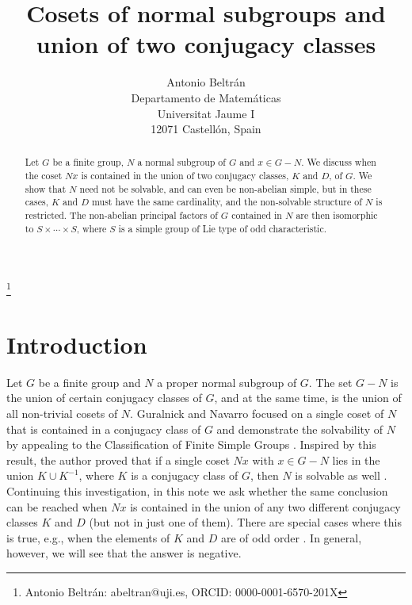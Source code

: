 \documentclass[12pt,leqno,a4paper]{amsart}
\numberwithin{equation}{section}
\begin{document}
\title[Cosets of normal subgroups and union of two conjugacy classes]{Cosets of normal subgroups  and union of two conjugacy classes}


    \author[Beltr\'an]{
       Antonio Beltr\'an\\
     Departamento de Matem\'aticas\\
      Universitat Jaume I \\
     12071 Castell\'on, Spain\\
        }

 \thanks{ Antonio Beltr\'an: abeltran@uji.es,                                                                                   ORCID: 0000-0001-6570-201X }




\begin{abstract}
Let $G$ be a finite group, $N$ a normal subgroup of $G$ and $x\in G-N$. We discuss when the coset $Nx$ is contained in the union of two conjugacy classes, $K$ and $D$,  of $G$. We show that $N$ need not be solvable, and can even be non-abelian simple, but in these cases, $K$ and $D$ must have the same cardinality, and the non-solvable structure of $N$ is restricted. The non-abelian principal factors of $G$  contained in $N$ are  then isomorphic to $S\times \cdots\times S$, where $S$ is a simple group of Lie type of odd characteristic.
\end{abstract}



\maketitle

\section{Introduction}

Let $G$ be a finite group and $N$ a  proper normal subgroup of $G$. The set $G - N$ is the union of certain conjugacy classes of $G$, and at the same time, is the union of all non-trivial cosets of $N$. Guralnick and Navarro focused on a single coset of $N$ that is contained in a conjugacy class of $G$  and demonstrate the solvability of $N$ by appealing to the Classification of Finite Simple Groups \cite[Theorem B(a)]{GN}. Inspired by this result, the author proved that if a single coset $Nx$ with $x\in G - N$ lies in the union $K\cup K^{-1}$, where $K$ is a conjugacy class of $G$, then  $N$ is solvable as well \cite{B}.  Continuing this investigation, in this note we ask whether the same conclusion can be reached when $Nx$ is contained in the union of any two different conjugacy classes $K$ and $D$ (but not in just one of them). There are special cases where this is true, e.g., when  the elements of $K$ and $D$ are of  odd order \cite[Theorem B(c)]{GN}. In general, however,  we will see that the answer is negative.
\end{document}
